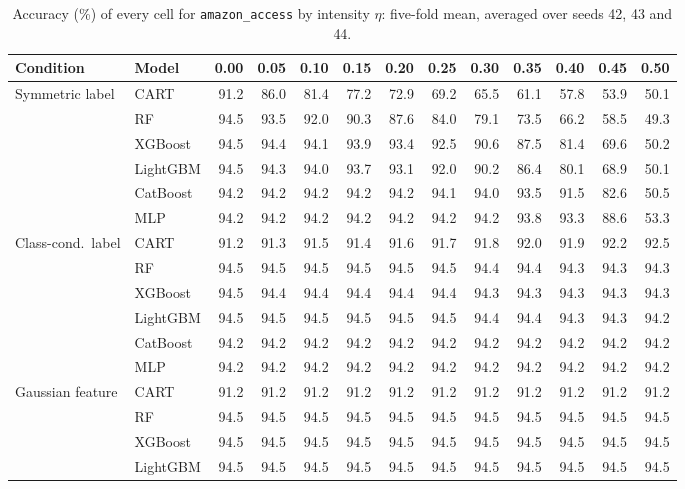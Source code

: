 \begin{table}[p]
\centering
\tiny
\setlength{\tabcolsep}{2.6pt}
\caption{Accuracy (\%) of every cell for \texttt{amazon\_access} by intensity $\eta$: five-fold mean, averaged over seeds 42, 43 and 44.}
\label{tab:grid_amazon_access}
\begin{tabular}{@{}llrrrrrrrrrrr@{}}
\toprule
Condition & Model & 0.00 & 0.05 & 0.10 & 0.15 & 0.20 & 0.25 & 0.30 & 0.35 & 0.40 & 0.45 & 0.50 \\
\midrule
Symmetric label & CART & 91.2 & 86.0 & 81.4 & 77.2 & 72.9 & 69.2 & 65.5 & 61.1 & 57.8 & 53.9 & 50.1 \\
 & RF & 94.5 & 93.5 & 92.0 & 90.3 & 87.6 & 84.0 & 79.1 & 73.5 & 66.2 & 58.5 & 49.3 \\
 & XGBoost & 94.5 & 94.4 & 94.1 & 93.9 & 93.4 & 92.5 & 90.6 & 87.5 & 81.4 & 69.6 & 50.2 \\
 & LightGBM & 94.5 & 94.3 & 94.0 & 93.7 & 93.1 & 92.0 & 90.2 & 86.4 & 80.1 & 68.9 & 50.1 \\
 & CatBoost & 94.2 & 94.2 & 94.2 & 94.2 & 94.2 & 94.1 & 94.0 & 93.5 & 91.5 & 82.6 & 50.5 \\
 & MLP & 94.2 & 94.2 & 94.2 & 94.2 & 94.2 & 94.2 & 94.2 & 93.8 & 93.3 & 88.6 & 53.3 \\
\midrule
Class-cond.\ label & CART & 91.2 & 91.3 & 91.5 & 91.4 & 91.6 & 91.7 & 91.8 & 92.0 & 91.9 & 92.2 & 92.5 \\
 & RF & 94.5 & 94.5 & 94.5 & 94.5 & 94.5 & 94.5 & 94.4 & 94.4 & 94.3 & 94.3 & 94.3 \\
 & XGBoost & 94.5 & 94.4 & 94.4 & 94.4 & 94.4 & 94.4 & 94.3 & 94.3 & 94.3 & 94.3 & 94.3 \\
 & LightGBM & 94.5 & 94.5 & 94.5 & 94.5 & 94.5 & 94.5 & 94.4 & 94.4 & 94.3 & 94.3 & 94.2 \\
 & CatBoost & 94.2 & 94.2 & 94.2 & 94.2 & 94.2 & 94.2 & 94.2 & 94.2 & 94.2 & 94.2 & 94.2 \\
 & MLP & 94.2 & 94.2 & 94.2 & 94.2 & 94.2 & 94.2 & 94.2 & 94.2 & 94.2 & 94.2 & 94.2 \\
\midrule
Gaussian feature & CART & 91.2 & 91.2 & 91.2 & 91.2 & 91.2 & 91.2 & 91.2 & 91.2 & 91.2 & 91.2 & 91.2 \\
 & RF & 94.5 & 94.5 & 94.5 & 94.5 & 94.5 & 94.5 & 94.5 & 94.5 & 94.5 & 94.5 & 94.5 \\
 & XGBoost & 94.5 & 94.5 & 94.5 & 94.5 & 94.5 & 94.5 & 94.5 & 94.5 & 94.5 & 94.5 & 94.5 \\
 & LightGBM & 94.5 & 94.5 & 94.5 & 94.5 & 94.5 & 94.5 & 94.5 & 94.5 & 94.5 & 94.5 & 94.5 \\

\end{tabular}
\end{table}
